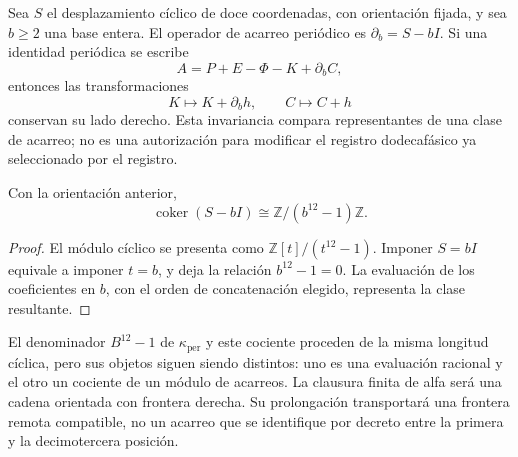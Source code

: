 Sea \(S\) el desplazamiento cíclico de doce coordenadas, con orientación
fijada, y sea \(b\geq2\) una base entera. El operador de acarreo
periódico es \(\partial_b=S-bI\). Si una identidad periódica se escribe
\[
 A=P+E-\Phi-K+\partial_bC,
\]
entonces las transformaciones
\[
 K\longmapsto K+\partial_bh,\qquad C\longmapsto C+h
\]
conservan su lado derecho. Esta invariancia compara representantes de una
clase de acarreo; no es una autorización para modificar el registro dodecafásico ya
seleccionado por el registro.

\begin{proposition}
\label{prop:k-cociente-acarreo}
Con la orientación anterior,
\[
 \operatorname{coker}(S-bI)\cong\mathbb Z/(b^{12}-1)\mathbb Z.
\]
\end{proposition}

\begin{proof}
El módulo cíclico se presenta como
\(\mathbb Z[t]/(t^{12}-1)\). Imponer \(S=bI\) equivale a imponer
\(t=b\), y deja la relación \(b^{12}-1=0\). La evaluación de los
coeficientes en \(b\), con el orden de concatenación elegido, representa
la clase resultante.
\end{proof}

El denominador \(B^{12}-1\) de \(\kappa_{\mathrm{per}}\) y este
cociente proceden de la misma longitud cíclica, pero sus objetos siguen
siendo distintos: uno es una evaluación racional y el otro un cociente
de un módulo de acarreos. La clausura finita de alfa será una cadena
orientada con frontera derecha. Su prolongación transportará una
frontera remota compatible, no un acarreo que se identifique por decreto
entre la primera y la decimotercera posición.
